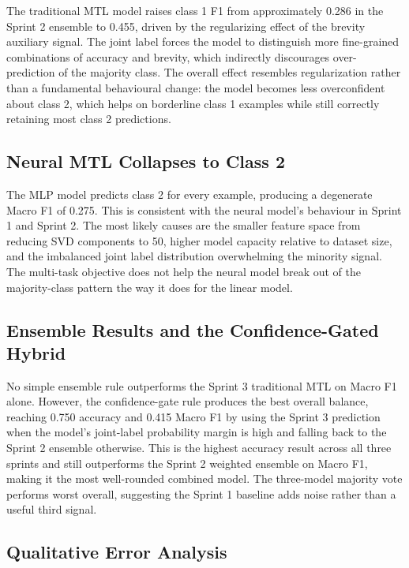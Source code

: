 \documentclass[11pt,twocolumn]{article}
\begin{document}
The traditional MTL model raises class 1 F1 from approximately 0.286 in the
Sprint 2 ensemble to 0.455, driven by the regularizing effect of the brevity
auxiliary signal. The joint label forces the model to distinguish more
fine-grained combinations of accuracy and brevity, which indirectly discourages
over-prediction of the majority class. The overall effect resembles
regularization rather than a fundamental behavioural change: the model becomes
less overconfident about class 2, which helps on borderline class 1 examples
while still correctly retaining most class 2 predictions.

\subsection{Neural MTL Collapses to Class 2}

The MLP model predicts class 2 for every example, producing a degenerate Macro
F1 of 0.275. This is consistent with the neural model's behaviour in Sprint 1
and Sprint 2. The most likely causes are the smaller feature space from reducing
SVD components to 50, higher model capacity relative to dataset size, and the
imbalanced joint label distribution overwhelming the minority signal. The
multi-task objective does not help the neural model break out of the
majority-class pattern the way it does for the linear model.

\subsection{Ensemble Results and the Confidence-Gated Hybrid}

No simple ensemble rule outperforms the Sprint 3 traditional MTL on Macro F1
alone. However, the confidence-gate rule produces the best overall balance,
reaching 0.750 accuracy and 0.415 Macro F1 by using the Sprint 3 prediction
when the model's joint-label probability margin is high and falling back to the
Sprint 2 ensemble otherwise. This is the highest accuracy result across all
three sprints and still outperforms the Sprint 2 weighted ensemble on Macro F1,
making it the most well-rounded combined model. The three-model majority vote
performs worst overall, suggesting the Sprint 1 baseline adds noise rather than
a useful third signal.

\subsection{Qualitative Error Analysis}
\end{document}

